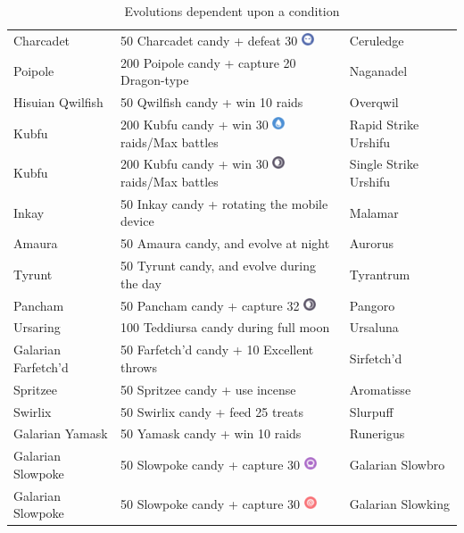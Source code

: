 \begin{table}
\begin{tabular}{lll}
  Charcadet	& 50 Charcadet candy + defeat 30 \includegraphics[width=1em,height=1em]{images/ghost.png}& Ceruledge\\
  Poipole & 200 Poipole candy + capture 20 Dragon-type & Naganadel\\
  Hisuian Qwilfish & 50 Qwilfish candy + win 10 raids & Overqwil\\
  Kubfu	& 200 Kubfu candy + win 30 \includegraphics[width=1em,height=1em]{images/water.png} raids/Max battles & Rapid Strike Urshifu\\
  Kubfu	& 200 Kubfu candy + win 30 \includegraphics[width=1em,height=1em]{images/dark.png} raids/Max battles & Single Strike Urshifu\\
  Inkay	& 50 Inkay candy + rotating the mobile device & Malamar\\
  Amaura & 50 Amaura candy, and evolve at night & Aurorus\\
  Tyrunt & 50 Tyrunt candy, and evolve during the day & Tyrantrum\\
  Pancham	& 50 Pancham candy + capture 32 \includegraphics[width=1em,height=1em]{images/dark.png} & Pangoro\\
  Ursaring & 100 Teddiursa candy during full moon & Ursaluna\\
  Galarian Farfetch'd & 50 Farfetch'd candy + 10 Excellent throws & Sirfetch'd \\
  Spritzee & 50 Spritzee candy + use incense & Aromatisse\\
  Swirlix & 50 Swirlix candy + feed 25 treats & Slurpuff\\
  Galarian Yamask & 50 Yamask candy + win 10 raids & Runerigus\\
  Galarian Slowpoke & 50 Slowpoke candy + capture 30 \includegraphics[width=1em,height=1em]{images/poison.png} & Galarian Slowbro\\
  Galarian Slowpoke & 50 Slowpoke candy + capture 30 \includegraphics[width=1em,height=1em]{images/psychic.png} & Galarian Slowking\\
\end{tabular}
  \caption{Evolutions dependent upon a condition\label{table:condevolutions}}
\end{table}
